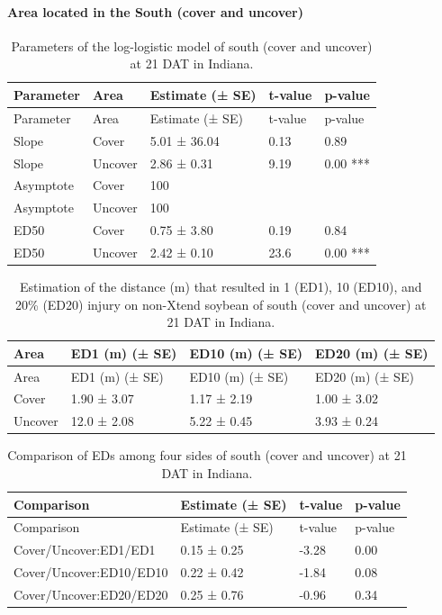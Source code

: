 \documentclass[]{article}
\let\oldparagraph\paragraph
\renewcommand{\paragraph}[1]{\oldparagraph{#1}\mbox{}}
\begin{document}
\newpage

\paragraph{\texorpdfstring{Area located in the \textbf{South} (cover and
uncover)}{Area located in the South (cover and uncover)}}\label{area-located-in-the-south-cover-and-uncover}

\begin{longtable}[]{@{}lllll@{}}
\caption{Parameters of the log-logistic model of south (cover and
uncover) at 21 DAT in Indiana.}\tabularnewline
\toprule
Parameter & Area & Estimate (± SE) & t-value & p-value\tabularnewline
\midrule
\endfirsthead
\toprule
Parameter & Area & Estimate (± SE) & t-value & p-value\tabularnewline
\midrule
\endhead
Slope & Cover & 5.01 ± 36.04 & 0.13 & 0.89\tabularnewline
Slope & Uncover & 2.86 ± 0.31 & 9.19 & 0.00 ***\tabularnewline
Asymptote & Cover & 100 & &\tabularnewline
Asymptote & Uncover & 100 & &\tabularnewline
ED50 & Cover & 0.75 ± 3.80 & 0.19 & 0.84\tabularnewline
ED50 & Uncover & 2.42 ± 0.10 & 23.6 & 0.00 ***\tabularnewline
\bottomrule
\end{longtable}

\begin{longtable}[]{@{}llll@{}}
\caption{Estimation of the distance (m) that resulted in 1 (ED1), 10
(ED10), and 20\% (ED20) injury on non-Xtend soybean of south (cover and
uncover) at 21 DAT in Indiana.}\tabularnewline
\toprule
Area & ED1 (m) (± SE) & ED10 (m) (± SE) & ED20 (m) (± SE)\tabularnewline
\midrule
\endfirsthead
\toprule
Area & ED1 (m) (± SE) & ED10 (m) (± SE) & ED20 (m) (± SE)\tabularnewline
\midrule
\endhead
Cover & 1.90 ± 3.07 & 1.17 ± 2.19 & 1.00 ± 3.02\tabularnewline
Uncover & 12.0 ± 2.08 & 5.22 ± 0.45 & 3.93 ± 0.24\tabularnewline
\bottomrule
\end{longtable}

\begin{longtable}[]{@{}llll@{}}
\caption{Comparison of EDs among four sides of south (cover and uncover)
at 21 DAT in Indiana.}\tabularnewline
\toprule
Comparison & Estimate (± SE) & t-value & p-value\tabularnewline
\midrule
\endfirsthead
\toprule
Comparison & Estimate (± SE) & t-value & p-value\tabularnewline
\midrule
\endhead
Cover/Uncover:ED1/ED1 & 0.15 ± 0.25 & -3.28 & 0.00\tabularnewline
Cover/Uncover:ED10/ED10 & 0.22 ± 0.42 & -1.84 & 0.08\tabularnewline
Cover/Uncover:ED20/ED20 & 0.25 ± 0.76 & -0.96 & 0.34\tabularnewline
\bottomrule
\end{longtable}
\end{document}
